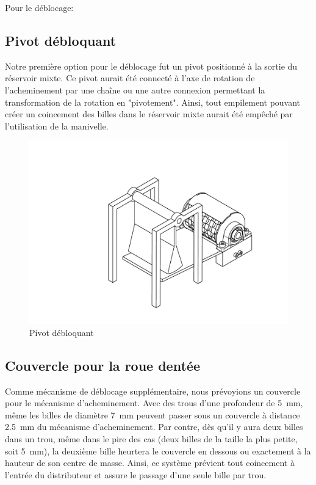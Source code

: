 Pour le déblocage: %
\subsection{Pivot débloquant} 
Notre première option pour le déblocage fut un pivot positionné à la sortie du réservoir mixte. Ce pivot aurait été connecté à l'axe de rotation de l'acheminement par une chaîne ou une autre connexion permettant la transformation de la rotation en "pivotement". Ainsi, tout empilement pouvant créer un coincement des billes dans le réservoir mixte aurait été empêché par l'utilisation de la manivelle.

\begin{figure}
    \centering
    \includegraphics[width=\textwidth]{Graphics/Images_concepts_Leon/ASSEMBLAGE_LOURD_AVEC_PIVOT.pdf}
    \caption{Pivot débloquant}
\end{figure}

\subsection{Couvercle pour la roue dentée}
Comme mécanisme de déblocage supplémentaire, nous prévoyions un couvercle pour le mécanisme d'acheminement. Avec des trous d'une profondeur de \SI{5}{\milli\metre}, même les billes de diamètre \SI{7}{\milli\metre} peuvent passer sous un couvercle à distance \SI{2.5}{\milli\metre} du mécanisme d'acheminement. Par contre, dès qu'il y aura deux billes dans un trou, même dans le pire des cas (deux billes de la taille la plus petite, soit \SI{5}{\milli\metre}), la deuxième bille heurtera le couvercle en dessous ou exactement à la hauteur de son centre de masse. Ainsi, ce système prévient tout coincement à l'entrée du distributeur et assure le passage d'une seule bille par trou.

